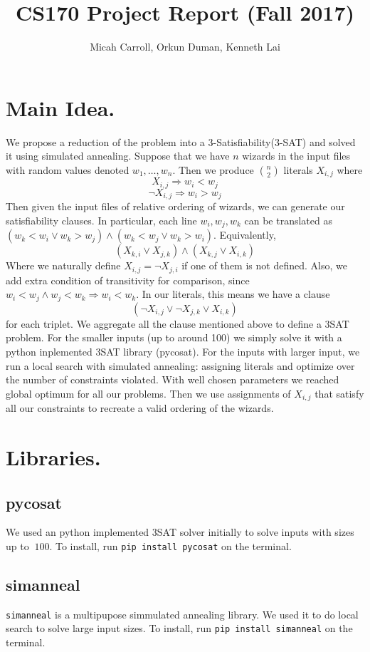\documentclass{article}
\theoremstyle{plain}
\numberwithin{theorem}{subsection}
\theoremstyle{definition}
\numberwithin{equation}{subsection}
\begin{document}
\title{CS170 Project Report (Fall 2017)}
\author{Micah Carroll, Orkun Duman, Kenneth Lai}
\maketitle
\tableofcontents
\eject
\section{Main Idea.} We propose a reduction of the problem into a 3-Satisfiability(3-SAT) and solved it using simulated annealing. Suppose that we have $n$ wizards in the input files with random values denoted $w_1, \dots, w_n$. Then we produce ${n \choose 2}$ literals $X_{i, j}$ where \[X_{i, j} \Rightarrow w_i < w_j\] \[\neg X_{i, j} \Rightarrow w_i > w_j\] Then given the input files of relative ordering of wizards, we can generate our satisfiability clauses. In particular, each line $w_i, w_j, w_k$ can be translated as $(w_k < w_i \vee w_k > w_j) \wedge (w_k < w_j \vee w_k > w_i)$. Equivalently, \[(X_{k, i} \vee X_{j, k}) \wedge (X_{k, j} \vee X_{i, k})\] Where we naturally define $X_{i, j} = \neg X_{j, i}$ if one of them is not defined. Also, we add extra condition of transitivity for comparison, since $w_i < w_j \wedge w_j < w_k \Rightarrow w_i < w_k$. In our literals, this means we have a clause \[(\neg X_{i, j} \vee \neg X_{j, k} \vee X_{i, k})\] for each triplet. We aggregate all the clause mentioned above to define a 3SAT problem. For the smaller inputs (up to around 100) we simply solve it with a python inplemented 3SAT library (pycosat). For the inputs with larger input, we run a local search with simulated annealing: assigning literals and optimize over the number of constraints violated. With well chosen parameters we reached global optimum for all our problems. Then we use assignments of $X_{i, j}$ that satisfy all our constraints to recreate a valid ordering of the wizards.

\section{Libraries.}
\subsection{pycosat} We used an python implemented 3SAT solver initially to solve inputs with sizes up to $~100$. To install, run \texttt{pip install pycosat} on the terminal. 
\subsection{simanneal} \texttt{simanneal} is a multipupose simmulated annealing library. We used it to do local search to solve large input sizes. To install, run \texttt{pip install simanneal} on the terminal.
\end{document}
